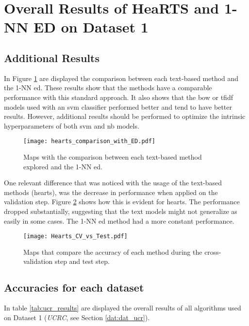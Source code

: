 \section{Overall Results of HeaRTS and 1-NN ED on Dataset 1}
\label{app:overall_ucr_results}

\subsection{Additional Results}

In Figure \ref{fig:comparison_with_ed} are displayed the comparison between each text-based method and the 1-NN \gls{ed}. These results show that the methods have a comparable performance with this standard approach. It also shows that the \gls{bow} or \gls{tfidf} models used with an \gls{svm} classifier performed better and tend to have better results. However, additional results should be performed to optimize the intrinsic hyperparameters of both \gls{svm} and \gls{nb} models.

\begin{figure}
\centering
\texttt{[image: hearts\_comparison\_with\_ED.pdf]}
\caption{Maps with the comparison between each text-based method explored and the 1-NN \gls{ed}.}
\label{fig:comparison_with_ed}
\end{figure}

One relevant difference that was noticed with the usage of the text-based methods (\gls{hearts}), was the decrease in performance when applied on the validation step. Figure \ref{fig:cv_vs_test} shows how this is evident for \gls{hearts}. The performance dropped substantially, suggesting that the text models might not generalize as easily in some cases. The 1-NN \gls{ed} method had a more constant performance.

\begin{figure}
\texttt{[image: Hearts\_CV\_vs\_Test.pdf]}
\caption{Maps that compare the accuracy of each method during the cross-validation step and test step.}
\label{fig:cv_vs_test}
\end{figure}


\subsection{Accuracies for each dataset}
\label{subsec:hearts_all_accuracies}

In table \ref{tab:ucr_results} are displayed the overall results of all algorithms used on Dataset 1 (\textit{UCRC}, see Section \ref{dat:dat_ucr}). 

